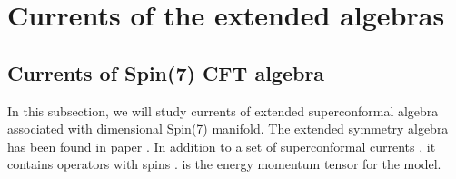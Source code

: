 \documentclass[a4paper,12pt]{article}
\numberwithin{equation}{section}
\providecommand{\Ncal}{{\cal N}}
\providecommand{\Spin}[1]{{\rm Spin}(#1)}
\begin{document}
\section{Currents of the extended algebras}
\subsection{Currents of \Spin7 CFT algebra}
In this subsection, we will study currents of extended 
superconformal algebra associated with \coordHE{} dimensional \Spin 7 manifold.
The extended symmetry algebra has been found in paper
\cite{Shatashvili:1994zw}.
In addition to a set of \myHighlight{$\Ncal=1$}\coordHE{} superconformal currents \coordHE{}, 
it contains operators \coordHE{} with spins \coordHE{}.
\coordHE{} is the energy momentum tensor 
for the \coordHE{} model. 
\end{document}
